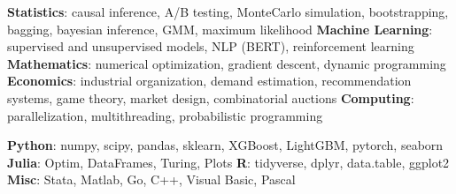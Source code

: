 \documentclass[a4paper]{mctemplate} %
\begin{document}
\begin{sidebar}

\makepicture{2.1cm}


\begin{contacttable}
\end{contacttable}


\begin{skilltable}
	\skillitem
	{\textbf{Statistics}: causal inference, A/B testing, MonteCarlo simulation, bootstrapping, bagging, bayesian inference, GMM, maximum likelihood}
	\skillitem
	{\textbf{Machine Learning}: supervised and unsupervised models, NLP (BERT), reinforcement learning}
	\skillitem
	{\textbf{Mathematics}: numerical optimization, gradient descent, dynamic programming}
	\skillitem
	{\textbf{Economics}: industrial organization, demand estimation, recommendation systems, game theory, market design, combinatorial auctions}
	\skillitem
	{\textbf{Computing}: parallelization, multithreading, probabilistic programming}
\end{skilltable}




\begin{codingtable}
	{\textbf{Python}: numpy, scipy, pandas, sklearn, XGBoost, LightGBM, pytorch, seaborn}
	{\textbf{Julia}: Optim, DataFrames, Turing, Plots}
	{\textbf{R}: tidyverse, dplyr, data.table, ggplot2}
	{\textbf{Misc}: Stata, Matlab, Go, C++, Visual Basic, Pascal}
\end{codingtable}


\end{sidebar}
\end{document}
